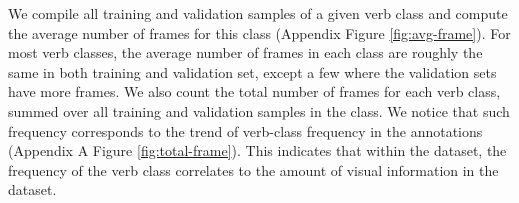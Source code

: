 We compile all training and validation samples of a given verb class and compute the average number of frames for this class (Appendix Figure \ref{fig:avg-frame}). For most verb classes, the average number of frames in each class are roughly the same in both training and validation set, except a few where the validation sets have more frames. We also count the total number of frames for each verb class, summed over all training and validation samples in the class. We notice that such frequency corresponds to the trend of verb-class frequency in the annotations (Appendix A Figure \ref{fig:total-frame}). This indicates that within the dataset, the frequency of the verb class correlates to the amount of visual information in the dataset.


